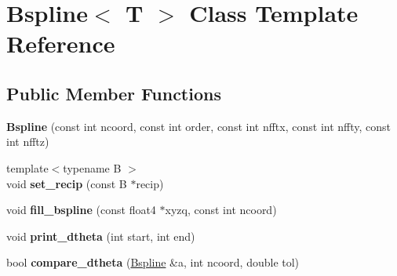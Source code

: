 \hypertarget{classBspline}{}\section{Bspline$<$ T $>$ Class Template Reference}
\label{classBspline}
\subsection*{Public Member Functions}
\begin{DoxyCompactItemize}
\item 
\hypertarget{classBspline_a9f37f4526e8eabbf677ad4ec50619e2c}{}\label{classBspline_a9f37f4526e8eabbf677ad4ec50619e2c} 
{\bfseries Bspline} (const int ncoord, const int order, const int nfftx, const int nffty, const int nfftz)
\item 
\hypertarget{classBspline_a8a2e8a8a733db362d0eb5721a8eb28f9}{}\label{classBspline_a8a2e8a8a733db362d0eb5721a8eb28f9} 
{\footnotesize template$<$typename B $>$ }\\void {\bfseries set\+\_\+recip} (const B $\ast$recip)
\item 
\hypertarget{classBspline_ae1f0a588d6c4a30952b88aade492e391}{}\label{classBspline_ae1f0a588d6c4a30952b88aade492e391} 
void {\bfseries fill\+\_\+bspline} (const float4 $\ast$xyzq, const int ncoord)
\item 
\hypertarget{classBspline_a7e42dc6c4a297d24811a96cbde9a9bff}{}\label{classBspline_a7e42dc6c4a297d24811a96cbde9a9bff} 
void {\bfseries print\+\_\+dtheta} (int start, int end)
\item 
\hypertarget{classBspline_ad78b6b8017abd6c4cc2218902ac64030}{}\label{classBspline_ad78b6b8017abd6c4cc2218902ac64030} 
bool {\bfseries compare\+\_\+dtheta} (\hyperlink{classBspline}{Bspline} \&a, int ncoord, double tol)
\end{DoxyCompactItemize}
